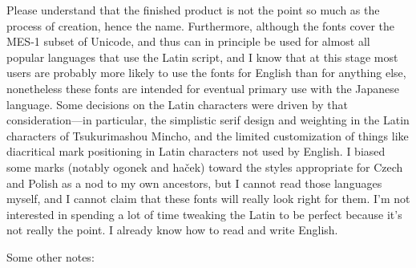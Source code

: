 \documentclass[14pt]{extarticle}
\begin{document}
Please understand that the finished product is not the point so much as the
process of creation, hence the name.  Furthermore, although the fonts cover
the MES-1 subset of Unicode, and thus can in principle be used for almost
all popular languages that use the Latin script, and I know that at this
stage most users are probably more likely to use the fonts for English than
for anything else, nonetheless these fonts are intended for eventual primary
use with the Japanese language.  Some decisions on the Latin characters were
driven by that consideration---in particular, the simplistic serif design
and weighting in the Latin characters of Tsukurimashou Mincho, and the
limited customization of things like diacritical mark positioning in Latin
characters not used by English.  I biased some marks (notably ogonek and
ha\v{c}ek) toward the styles appropriate for Czech and Polish as a nod to my
own ancestors, but I cannot read those languages myself, and I cannot claim
that these fonts will really look right for them.  I'm not interested in
spending a lot of time tweaking the Latin to be perfect because it's not
really the point. I already know how to read and write English.

Some other notes:
\end{document}
